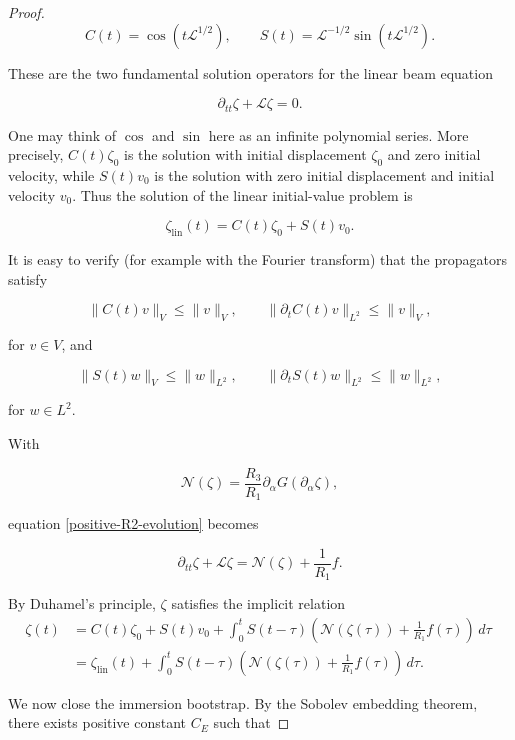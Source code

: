 \documentclass[10pt,a4paper]{amsart}
\begin{document}
\begin{proof}
$$
    C(t)=\cos(t\mathcal L^{1/2}),
    \qquad
    S(t)=\mathcal L^{-1/2}\sin(t\mathcal L^{1/2}).
$$

These are the two fundamental solution operators for the linear beam equation

$$
    \partial_{tt}\zeta+\mathcal L\zeta=0.
$$

One may think of $\cos$ and $\sin$ here as an infinite polynomial series. More precisely, \(C(t)\zeta_0\) is the solution with initial displacement \(\zeta_0\) and zero initial velocity, while \(S(t)v_0\) is the solution with zero initial displacement and initial velocity \(v_0\). Thus the solution of the linear initial-value problem is

$$
    \zeta_{\mathrm{lin}}(t)
    =
    C(t)\zeta_0+S(t)v_0.
$$

It is easy to verify (for example with the Fourier transform) that the propagators satisfy

$$
    \|C(t)v\|_V\leq\|v\|_V,
    \qquad
    \|\partial_tC(t)v\|_{L^2}\leq\|v\|_V,
$$

for \(v\in V\), and

$$
    \|S(t)w\|_V\leq\|w\|_{L^2},
    \qquad
    \|\partial_tS(t)w\|_{L^2}\leq\|w\|_{L^2},
$$

for \(w\in L^2\).
\newline

With

$$
    \mathcal N(\zeta)
    =
    \frac{R_3}{R_1}
    \partial_\alpha G(\partial_\alpha\zeta),
$$

equation \eqref{positive-R2-evolution} becomes

$$
    \partial_{tt}\zeta+\mathcal L\zeta
    =
    \mathcal N(\zeta)+\frac{1}{R_1}f.
$$

By Duhamel's principle, $\zeta$ satisfies the implicit relation
\begin{equation}
\begin{aligned}
\zeta(t)
&=
C(t)\zeta_0+S(t)v_0+
\int_0^t
S(t-\tau)
\left(
\mathcal N(\zeta(\tau))
+\frac{1}{R_1}f(\tau)
\right)\,d\tau\ \\
&=
\zeta_{\mathrm{lin}}(t)
+
\int_0^t
S(t-\tau)
\left(
\mathcal N(\zeta(\tau))
+\frac{1}{R_1}f(\tau)
\right)\,d\tau.
\end{aligned}
\label{positive-R2-duhamel}
\end{equation}

We now close the immersion bootstrap. By the Sobolev embedding theorem, there exists positive constant \(C_E\) such that


\end{proof}
\end{document}
